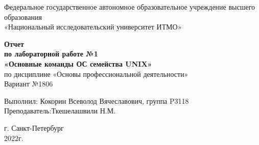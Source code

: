 \documentclass[12pt,onecolumn]{article}
\begin{document}
\begin{center}
    Федеральное государственное автономное образовательное учреждение высшего образования\\
	«Национальный исследовательский университет ИТМО»
\end{center}
\vspace{1cm}


\begin{center}
    \large \textbf{Отчет}\\
    \textbf{по лабораторной работе №1}\\
    \large \textbf{«Основные команды ОС семейства UNIX»}\\
     по дисциплине «Основы профессиональной деятельности»\\
	\vspace{1cm}
    Вариант №1806\\
\end{center}

\vspace{10cm}
\begin{flushright}
  Выполнил: Кокорин Всеволод Вячеславович, группа P3118\\
  Преподаватель:Ткешелашвили Н.М.\\
\end{flushright}

\vspace{5cm}
\begin{center}
    г. Санкт-Петербург\\
    2022г.
\end{center}
\newpage
\tableofcontents
\newpage
\end{document}
